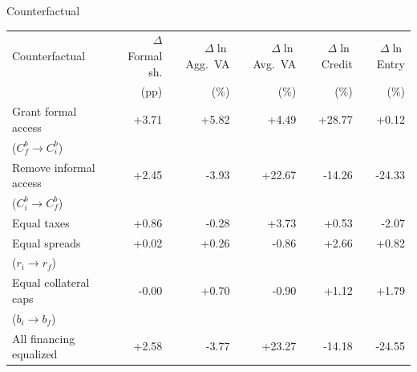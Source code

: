 \documentclass[aspectratio=169]{beamer}
\begin{document}
\begin{frame}[noframenumbering]{Counterfactual}
\label{secondcounterfactual}

\footnotesize
\begin{tabular}{lrrrrr}
\toprule
Counterfactual & $\Delta$ Formal sh. & $\Delta\ln$ Agg.\ VA & $\Delta\ln$ Avg.\ VA & $\Delta\ln$ Credit & $\Delta\ln$ Entry \\
 & (pp) & (\%) & (\%) & (\%) & (\%) \\
\midrule
Grant formal access & +3.71 & +5.82 & +4.49 & +28.77 & +0.12 \\
($C^b_f \to C^b_i$) &  & &  &  &  \\
Remove informal access  & +2.45 & -3.93 & +22.67 & -14.26 & -24.33 \\
($C^b_i \to C^b_f$) &  &  & &  &  \\
Equal taxes & +0.86 & -0.28 & +3.73 & +0.53 & -2.07 \\
Equal spreads  & +0.02 & +0.26 & -0.86 & +2.66 & +0.82 \\
($r_i \to r_f$) &  &  &  &  &  \\
Equal collateral caps & -0.00 & +0.70 & -0.90 & +1.12 & +1.79 \\
($b_i\to b_f$) &  &  &  &  &  \\
All financing equalized & +2.58 & -3.77 & +23.27 & -14.18 & -24.55 \\
\bottomrule
\end{tabular}

\vspace{5mm}

\hyperlink{maincounterfactual}{}

\end{frame}

\end{document}
